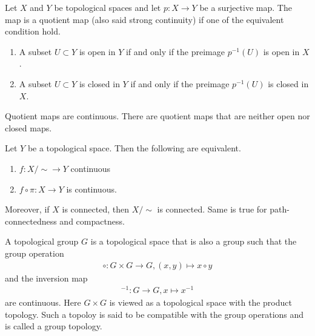 \begin{defbox}
    Let \(X\) and \(Y\) be topological spaces and let \(p: X \longrightarrow Y\) be a surjective map. The map is a quotient map (also said strong continuity) if one of the equivalent condition hold.
    \begin{enumerate}
        \item A subset \(U \subset Y\) is open in \(Y\) if and only if the preimage \(p^{-1}(U)\) is open in \(X\).
        \item A subset \(U \subset Y\) is closed in \(Y\) if and only if the preimage \(p^{-1}(U)\) is closed in \(X\).
    \end{enumerate}
\end{defbox}
\begin{rembox}
    \begin{remark}
        Quotient maps are continuous. There are quotient maps that are neither open nor closed maps.
    \end{remark}
\end{rembox}

\begin{thmbox}
    \begin{theorem}
        Let \(Y\) be a topological space. Then the following are equivalent.
        \begin{enumerate}
            \item \(f: X / \sim \longrightarrow Y\) continuous
            \item \(f \circ \pi : X \longrightarrow Y\) is continuous.
        \end{enumerate}

        Moreover, if \(X\) is connected, then \(X / \sim\) is connected. Same is true for path-connectedness and compactness.
    \end{theorem}
\end{thmbox}

\begin{defbox}
    \begin{definition}
        A topological group \(G\) is a topological space that is also a group such that the group operation
        \begin{align*}
            \circ: G \times G \longrightarrow G, (x, y) \mapsto x \circ y
        \end{align*}
        and the inversion map
        \begin{align*}
            ^{-1}: G \longrightarrow G, x \mapsto x^{-1}
        \end{align*}
        are continuous. Here \(G \times G\) is viewed as a topological space with the product topology. Such a topoloy is said to be compatible with the group operations and is called a group topology.
    \end{definition}
\end{defbox}

